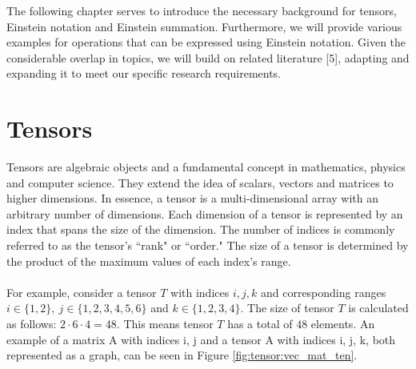 The following chapter serves to introduce the necessary background for tensors,
Einstein notation and Einstein summation. Furthermore, we will provide various
examples for operations that can be expressed using Einstein notation. Given the
considerable overlap in topics, we will build on related literature [5], adapting
and expanding it to meet our specific research requirements.

\section{Tensors}
Tensors are algebraic objects and a fundamental concept in mathematics, physics
and computer science. They extend the idea of scalars, vectors and matrices to
higher dimensions. In essence, a tensor is a multi-dimensional array with an arbitrary
number of dimensions. Each dimension of a tensor is represented by an index that spans
the size of the dimension. The number of indices is commonly referred to as the
tensor's ``rank" or ``order." The size of a tensor is determined by the product
of the maximum values of each index's range.
\\
\\
For example, consider a tensor $T$ with indices $i,j,k$ and corresponding ranges
$i \in \{1,2\},\ j \in \{1,2,3,4,5,6\}$ and $k \in \{1,2,3,4\}$. The size of
tensor $T$ is calculated as follows: $2 \cdot 6 \cdot 4 = 48$. This means tensor
$T$ has a total of $48$ elements. An example of a matrix A with indices i, j and a tensor
A with indices i, j, k, both represented as a graph, can be seen in Figure
\ref{fig:tensor:vec_mat_ten}.

